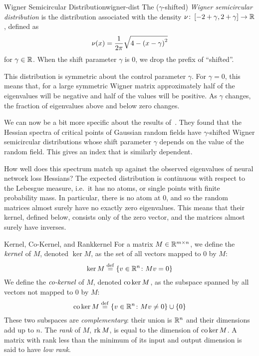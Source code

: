 \documentclass[../../thesis.tex]{subfiles}
\begin{document}
\begin{definition}{Wigner Semicircular Distribution}{wigner-dist}
	The ($\gamma$-shifted) \emph{Wigner semicircular distribution}
	is the distribution associated with the density
	$\nu \colon \left[-2+\gamma, 2+\gamma\right] \to \mathbb{R}$,
	defined as
	\begin{equation}\equationlabel{def-wigner-dist}
		\nu(x) = \frac{1}{2\pi}\sqrt{4 - {(x-\gamma)}^2}
	\end{equation}
	for $\gamma\in\mathbb{R}$.
	When the shift parameter $\gamma$ is $0$,
	we drop the prefix of \enquote{shifted}.
\end{definition}
This distribution is symmetric about the control parameter $\gamma$.
For $\gamma=0$, this means that, for a large symmetric Wigner matrix
approximately half of the eigenvalues will
be negative and half of the values will be positive.
As $\gamma$ changes, the fraction of eigenvalues above and below zero changes.

We can now be a bit more specific about the results of~\cite{bray2007}.
They found that the Hessian spectra of
critical points of Gaussian random fields
have $\gamma$-shifted Wigner semicircular distributions
whose shift parameter $\gamma$ depends on the value of the random field.
This gives an index that is similarly dependent.

How well does this spectrum match up against the observed eigenvalues
of neural network loss Hessians?
The expected distribution is
continuous with respect to the Lebesgue measure,
i.e.~it has no atoms, or single points with finite probability mass.
In particular, there is no atom at $0$,
and so the random matrices almost surely have no exactly zero eigenvalues.
This means that their kernel, defined below, consists only of the zero vector,
and the matrices almost surely have inverses.

\begin{definition}{Kernel, Co-Kernel, and Rank}{kernel}
	For a matrix $M\in\mathbb{R}^{m\times n}$,
	we define the $\emph{kernel}$ of $M$,
	denoted $\ker M$,
	as the set of all vectors mapped to $0$ by $M$:
	\begin{equation}\equationlabel{def-ker}
		\ker M \defeq \Set{v \in \R^n \suchthat Mv = 0}
	\end{equation}
	We define the $\emph{co-kernel}$ of $M$,
	denoted $\operatorname*{co}\ker M$,
	as the subspace spanned by all vectors not mapped to $0$ by $M$:
	\begin{equation}\equationlabel{def-coker}
		\co\ker M \defeq \Set{v \in \R^n \suchthat Mv \neq 0} \cup \Set{0}
	\end{equation}
	These two subspaces are \emph{complementary}:
	their union is $\mathbb{R}^n$
	and their dimensions add up to $n$.
	The \emph{rank} of $M$, $\operatorname*{rk} M$,
	is equal to the dimension of $\operatorname*{co}\ker M$.
	A matrix with rank less than the minimum
	of its input and output dimension
	is said to have \emph{low rank}.
\end{definition}
\end{document}
